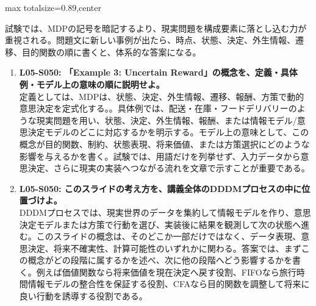 \begin{minipage}[t]{0.58\textwidth}
\begin{adjustbox}{max totalsize={\textwidth}{0.89\textheight},center}
\begin{minipage}{\textwidth}
試験では、MDPの記号を暗記するより、現実問題を構成要素に落とし込む力が重視される。問題文に新しい事例が出たら、時点、状態、決定、外生情報、遷移、目的関数の順に書くと、体系的な答案になる。\par{}\begin{enumerate}\item \textbf{L05-S050: 「Example 3: Uncertain Reward」の概念を、定義・具体例・モデル上の意味の順に説明せよ。}\\定義としては、MDPは、状態、決定、外生情報、遷移、報酬、方策で動的意思決定を定式化する。。具体例では、配送・在庫・フードデリバリーのような現実問題を用い、状態、決定、外生情報、報酬、または情報モデル/意思決定モデルのどこに対応するかを明示する。モデル上の意味として、この概念が目的関数、制約、状態表現、将来価値、または方策選択にどのような影響を与えるかを書く。試験では、用語だけを列挙せず、入力データから意思決定、さらに現実の実装へつながる流れを文章で示すことが重要である。\item \textbf{L05-S050: このスライドの考え方を、講義全体のDDDMプロセスの中に位置づけよ。}\\DDDMプロセスでは、現実世界のデータを集約して情報モデルを作り、意思決定モデルまたは方策で行動を選び、実装後に結果を観測して次の状態へ進む。このスライドの概念は、そのどこか一部だけではなく、データ表現、意思決定、将来不確実性、計算可能性のいずれかに関わる。答案では、まずこの概念がどの段階に属するかを述べ、次に他の段階へどう影響するかを書く。例えば価値関数なら将来価値を現在決定へ戻す役割、FIFOなら旅行時間情報モデルの整合性を保証する役割、CFAなら目的関数を調整して将来に良い行動を誘導する役割である。\end{enumerate}
\end{minipage}
\end{adjustbox}
\end{minipage}


